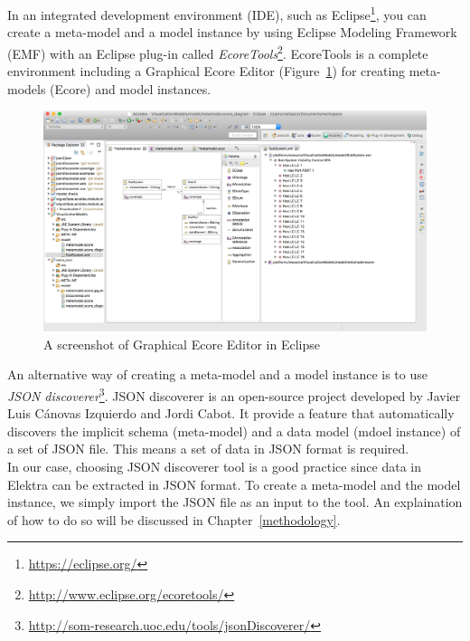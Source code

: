 In an integrated development environment (IDE), such as Eclipse\footnote{\url{https://eclipse.org/}}, you can create a meta-model and a model instance by using Eclipse Modeling Framework (EMF) with an Eclipse plug-in called \textit{EcoreTools}\footnote{\url{http://www.eclipse.org/ecoretools/}}. EcoreTools is a complete environment including a Graphical Ecore Editor (Figure~\ref{fig:screenshot_ecore_editor}) for creating meta-models (Ecore) and model instances. 

\begin{figure}[H]
\centering
\captionsetup{justification=centering}
\vspace{0cm}%
\includegraphics[width=0.95\linewidth]{figure/misc/screenshot_ecore_editor.png}
\caption{A screenshot of Graphical Ecore Editor in Eclipse}
\label{fig:screenshot_ecore_editor}
\end{figure}

An alternative way of creating a meta-model and a model instance is to use \textit{JSON discoverer}\footnote{\url{http://som-research.uoc.edu/tools/jsonDiscoverer/}}. JSON discoverer is an open-source project developed by Javier Luis Cánovas Izquierdo and Jordi Cabot. It provide a feature that automatically discovers the implicit schema (meta-model) and a data model (mdoel instance) of a set of JSON file. This means a set of data in JSON format is required. \\ 

In our case, choosing JSON discoverer tool is a good practice since data in Elektra can be extracted in JSON format. To create a meta-model and the model instance, we simply import the JSON file as an input to the tool. An explaination of how to do so will be discussed in Chapter~\ref{methodology}.



